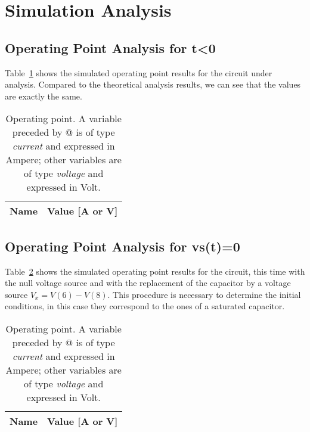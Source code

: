 \section{Simulation Analysis}
\label{sec:simulation}


\subsection{Operating Point Analysis for t\textless0}

Table~\ref{tab:op1} shows the simulated operating point results for the circuit
under analysis. Compared to the theoretical analysis results, we can see that the values are exactly the same.

\begin{table}[ht]
  \centering
  \begin{tabular}{|l|r|}
    \hline    
    {\bf Name} & {\bf Value [A or V]} \\ \hline
    
  \end{tabular}
  \caption{Operating point. A variable preceded by @ is of type {\em current}
    and expressed in Ampere; other variables are of type {\it voltage} and expressed in
    Volt.}
  \label{tab:op1}
\end{table}



\subsection{Operating Point Analysis for vs(t)=0}

Table~\ref{tab:op2} shows the simulated operating point results for the circuit, this time with the null voltage source and with the replacement of the capacitor by a voltage source $V_x=V(6)-V(8)$. This procedure is necessary to determine the initial conditions, in this case they correspond to the ones of a saturated capacitor. 

\begin{table}[ht]
  \centering
  \begin{tabular}{|l|r|}
    \hline    
    {\bf Name} & {\bf Value [A or V]} \\ \hline
    
  \end{tabular}
  \caption{Operating point. A variable preceded by @ is of type {\em current}
    and expressed in Ampere; other variables are of type {\it voltage} and expressed in
    Volt.}
  \label{tab:op2}
\end{table}

